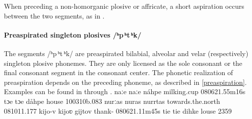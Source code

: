 When preceding a non-homorganic plosive or affricate, a short aspiration occurs between the two segments, as in . 



\paragraph{Preaspirated singleton plosives /ʰp\,ʰt\,ʰk/}
The segments \mbox{/ʰp\,ʰt\,ʰk/} are preaspirated bilabial, alveolar and velar (respectively) singleton plosive phonemes. They are only licensed as the sole consonant or the final consonant segment in the consonant center. 
The phonetic realization of preaspiration depends on the preceding phoneme, as described in \SEC\ref{preaspiration}. 
Examples can be found in  through . 
	{naːe}		{naːe}	{náhpe}	{milking.cup\BS{}}	{080621}{.55m16s}
		{tɔe}		{tɔe}		{dåhpe}	{house\BS{}}		{100310b}{.083}
		{nurːas}	{nuras}	{nurrtas}	{towards.the.north}		{081011}{.177}
		{kijo-v}		{kijoʋ}		{gijtov}	{thank-}		{080621}{.11m45s}
		{tie}		{tie}		{dihke}	{louse\BS{}}		{2359}

